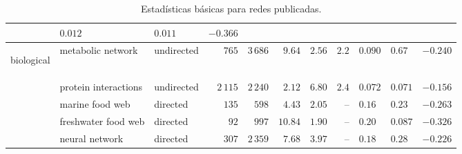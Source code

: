 \begin{table}[!hbt]
{\begin{minipage}{\textwidth}
\begin{tabular}{l|l|l|r|r|r|r|r|l|l|r|}
 & $0.012$ & $0.011$ & $-0.366$  \\
\hline
\begin{rotate}{90}
\hbox{\hspace{-4.4em}biological}
\end{rotate}
 & metabolic network         & undirected & $765$           & $3\,686$           & $9.64$  & $2.56$  & $2.2$
 & $0.090$ & $0.67$  & $-0.240$  \\
 & protein interactions      & undirected & $2\,115$        & $2\,240$           & $2.12$  & $6.80$  & $2.4$
 & $0.072$ & $0.071$ & $-0.156$  \\
 & marine food web           & directed   & $135$           & $598$              & $4.43$  & $2.05$  & --
 & $0.16$  & $0.23$  & $-0.263$  \\
 & freshwater food web       & directed   & $92$            & $997$              & $10.84$ & $1.90$  & --
 & $0.20$  & $0.087$ & $-0.326$  \\
 & neural network            & directed   & $307$           & $2\,359$           & $7.68$  & $3.97$  & --
 & $0.18$  & $0.28$  & $-0.226$  \\
\end{tabular}
\caption{Estadísticas básicas para redes publicadas.}
\end{minipage}

}
\end{table}
\label{table:networks}
